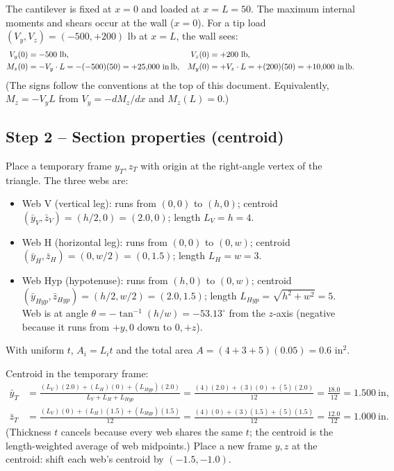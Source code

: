 \documentclass[11pt]{article}
\begin{document}
The cantilever is fixed at $x = 0$ and loaded at $x = L = 50$. The maximum internal moments and shears occur at the wall ($x = 0$). For a tip load $(V_y, V_z) = (-500, +200)$ lb at $x = L$, the wall sees:
\begin{align*}
V_y(0) &= -500\ \text{lb}, & V_z(0) &= +200\ \text{lb},\\
M_z(0) &= -V_y \cdot L = -(-500)(50) = +25{,}000\ \text{in\,lb}, & M_y(0) &= +V_z \cdot L = +(200)(50) = +10{,}000\ \text{in\,lb}.
\end{align*}
(The signs follow the conventions at the top of this document. Equivalently, $M_z = -V_y L$ from $V_y = -dM_z/dx$ and $M_z(L) = 0$.)

\subsection*{Step 2 -- Section properties (centroid)}

Place a temporary frame $y_T, z_T$ with origin at the right-angle vertex of the triangle. The three webs are:
\begin{itemize}[leftmargin=2em, itemsep=0pt]
  \item Web V (vertical leg): runs from $(0, 0)$ to $(h, 0)$; centroid $(\bar y_V, \bar z_V) = (h/2, 0) = (2.0, 0)$; length $L_V = h = 4$.
  \item Web H (horizontal leg): runs from $(0, 0)$ to $(0, w)$; centroid $(\bar y_H, \bar z_H) = (0, w/2) = (0, 1.5)$; length $L_H = w = 3$.
  \item Web Hyp (hypotenuse): runs from $(h, 0)$ to $(0, w)$; centroid $(\bar y_{\!H\!yp}, \bar z_{\!H\!yp}) = (h/2, w/2) = (2.0, 1.5)$; length $L_{\!H\!yp} = \sqrt{h^2 + w^2} = 5$. Web is at angle $\theta = -\tan^{-1}(h/w) = -53.13^\circ$ from the $z$-axis (negative because it runs from $+y, 0$ down to $0, +z$).
\end{itemize}
With uniform $t$, $A_i = L_i t$ and the total area $A = (4+3+5)(0.05) = 0.6$ in$^2$.

Centroid in the temporary frame:
\begin{align*}
\bar y_T &= \frac{(L_V)(2.0) + (L_H)(0) + (L_{\!H\!yp})(2.0)}{L_V + L_H + L_{\!H\!yp}}
       = \frac{(4)(2.0) + (3)(0) + (5)(2.0)}{12} = \frac{18.0}{12} = 1.500\ \text{in},\\
\bar z_T &= \frac{(L_V)(0) + (L_H)(1.5) + (L_{\!H\!yp})(1.5)}{12}
       = \frac{(4)(0) + (3)(1.5) + (5)(1.5)}{12} = \frac{12.0}{12} = 1.000\ \text{in}.
\end{align*}
(Thickness $t$ cancels because every web shares the same $t$; the centroid is the length-weighted average of web midpoints.) Place a new frame $y, z$ at the centroid: shift each web's centroid by $(-1.5, -1.0)$.
\end{document}

